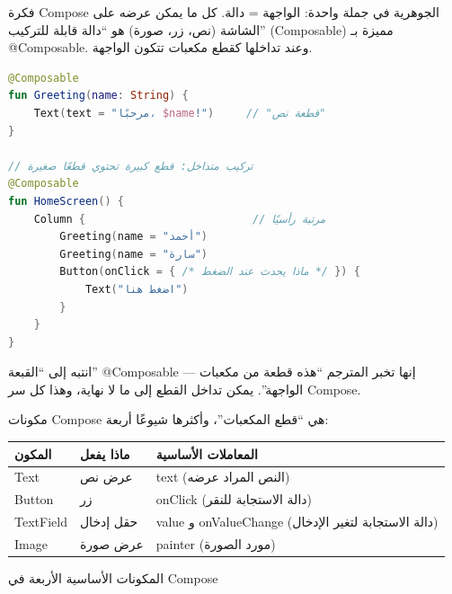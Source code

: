 


فكرة Compose الجوهرية في جملة واحدة: الواجهة = دالة. كل ما يمكن عرضه على الشاشة (نص، زر، صورة) هو “دالة قابلة للتركيب” (Composable) مميزة بـ @Composable. وعند تداخلها كقطع مكعبات تتكون الواجهة.

\begin{lstlisting}[language=Kotlin]
@Composable
fun Greeting(name: String) {
    Text(text = "مرحبًا، $name!")     // "قطعة نص"
}

// تركيب متداخل: قطع كبيرة تحتوي قطعًا صغيرة
@Composable
fun HomeScreen() {
    Column {                          // مرتبة رأسيًا
        Greeting(name = "أحمد")
        Greeting(name = "سارة")
        Button(onClick = { /* ماذا يحدث عند الضغط */ }) {
            Text("اضغط هنا")
        }
    }
}
\end{lstlisting}

انتبه إلى “القبعة” @Composable — إنها تخبر المترجم “هذه قطعة من مكعبات الواجهة”. يمكن تداخل القطع إلى ما لا نهاية، وهذا كل سر Compose.


مكونات Compose هي “قطع المكعبات”، وأكثرها شيوعًا أربعة:

\begin{center}
\begin{tabularx}{\linewidth}{|X|X|X|}
\hline
\textbf{المكون} & \textbf{ماذا يفعل} & \textbf{المعاملات الأساسية} \tabularnewline
\hline
Text & عرض نص & text (النص المراد عرضه) \tabularnewline
Button & زر & onClick (دالة الاستجابة للنقر) \tabularnewline
TextField & حقل إدخال & value و onValueChange (دالة الاستجابة لتغير الإدخال) \tabularnewline
Image & عرض صورة & painter (مورد الصورة) \tabularnewline
\hline
\end{tabularx}
\end{center}

\begin{center}\small\color{gray}المكونات الأساسية الأربعة في Compose\end{center}

